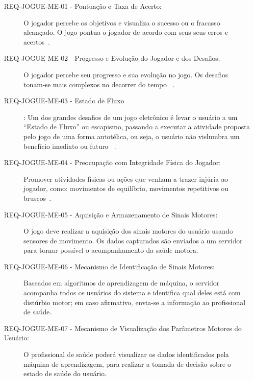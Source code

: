 \begin{description}
	\item[REQ-JOGUE-ME-01 - Pontuação e Taxa de Acerto:] O jogador percebe os objetivos e visualiza o sucesso ou o fracasso alcançado. O jogo pontua o jogador de acordo com seus seus erros e acertos~\cite{Suhonen:2008:SFE:1457199.1457204,sinclair07}.
	\item[REQ-JOGUE-ME-02 - Progresso e Evolução do Jogador e dos Desafios:] O jogador percebe seu progresso e sua evolução no jogo. Os desafios tonam-se mais complexos no decorrer do tempo ~\cite{Suhonen:2008:SFE:1457199.1457204}.
	\item[REQ-JOGUE-ME-03 - Estado de Fluxo]: Um dos grandes desafios de um jogo eletrônico é levar o usuário a um ``Estado de Fluxo'' ou escapismo, passando a executar a atividade proposta pelo jogo de uma forma autotélica, ou seja, o usuário não vislumbra um benefício imediato ou futuro ~\cite{sweetser2005-gameflow}. 
	\item[REQ-JOGUE-ME-04 - Preocupação com Integridade Física do Jogador:] Promover atividades físicas ou ações que venham a trazer injúria ao jogador, como: movimentos de equilíbrio, movimentos repetitivos ou bruscos~\cite{arntzen2011,sinclair07}.
	\item[REQ-JOGUE-ME-05 - Aquisição e Armazenamento de Sinais Motores:] O jogo deve realizar a aquisição dos sinais motores do usuário usando sensores de movimento. Os dados capturados são enviados a um servidor para tornar possível o acompanhamento da saúde motora.
	\item[REQ-JOGUE-ME-06 - Mecanismo de Identificação de Sinais Motores:] Baseados em algoritmos de aprendizagem de máquina, o servidor acompanha todos os usuários do sistema e identifica qual deles está com distúrbio motor; em caso afirmativo, envia-se a informação ao profissional de saúde.
	\item[REQ-JOGUE-ME-07 - Mecanismo de Visualização dos Parâmetros Motores do Usuário:] O profissional de saúde poderá visualizar os dados identificados pela máquina de aprendizagem, para realizar a tomada de decisão sobre o estado de saúde do usuário.
\end{description}



